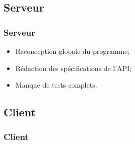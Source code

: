 \subsection{Serveur}
	\begin{frame}
		\frametitle{Serveur}
        \begin{itemize}
            \item Reconception globale du programme; \newline
            \item Rédaction des spécifications de l'API; \newline
            \item Manque de tests complets. \newline
        \end{itemize}
	\end{frame}

\subsection{Client}
	\begin{frame}
		\frametitle{Client}
	\end{frame}
